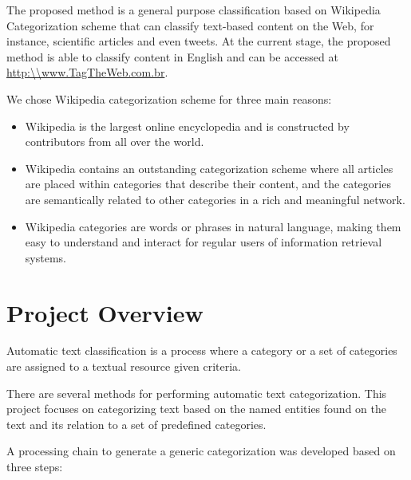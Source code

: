 The proposed method is a general purpose classification based on Wikipedia Categorization scheme that can classify text-based content on the Web, for instance, scientific articles and even tweets. At the current stage, the proposed method is able to classify content in English and can be accessed at \url{http:\\www.TagTheWeb.com.br}.


We chose Wikipedia categorization scheme for three main reasons: 

\begin{itemize}
\item  Wikipedia is the largest online encyclopedia and is constructed by contributors from all over the world.
\item Wikipedia contains an outstanding categorization scheme where all articles are placed within categories that describe their content, and the categories are semantically related to other categories in a rich and meaningful network.
\item Wikipedia categories are words or phrases in natural language, making them easy to understand and interact for regular users of information retrieval systems.
\end{itemize}


\section{\hspace*{3pt} Project Overview}

Automatic text classification is a process where a category or a set of categories are assigned to a textual resource given criteria.

There are several methods for performing automatic text categorization. This project focuses on categorizing text based on the named entities found on the text and its relation to a set of predefined categories.

A processing chain to generate a generic categorization was developed based on three steps:

